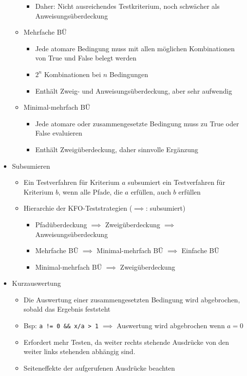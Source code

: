 \documentclass{article}
\begin{document}
\begin{itemize}
\begin{itemize}
\begin{itemize}
      \item Daher: Nicht ausreichendes Testkriterium, noch schwächer als Anweisungsüberdeckung
    \end{itemize}
    \item Mehrfache BÜ
    \begin{itemize}
      \item Jede atomare Bedingung muss mit allen möglichen Kombinationen von True und False belegt werden
      \item $2^n$ Kombinationen bei $n$ Bedingungen
      \item Enthält Zweig- und Anweisungsüberdeckung, aber sehr aufwendig
    \end{itemize}
    \item Minimal-mehrfach BÜ
    \begin{itemize}
      \item Jede atomare oder zusammengesetzte Bedingung muss zu True oder False evaluieren
      \item Enthält Zweigüberdeckung, daher sinnvolle Ergänzung
    \end{itemize}
  \end{itemize}
  \item Subsumieren
  \begin{itemize}
    \item Ein Testverfahren für Kriterium $a$ subsumiert ein Testverfahren für Kriterium $b$, wenn alle Pfade, die $a$ erfüllen, auch $b$ erfüllen
    \item Hierarchie der KFO-Teststrategien ($\implies$: subsumiert)
    \begin{itemize}
      \item Pfadüberdeckung $\implies$ Zweigüberdeckung $\implies$ Anweisungsüberdeckung
      \item Mehrfache BÜ $\implies$ Minimal-mehrfach BÜ $\implies$ Einfache BÜ
      \item Minimal-mehrfach BÜ $\implies$ Zweigüberdeckung
    \end{itemize}
  \end{itemize}
  \item Kurzauswertung
  \begin{itemize}
    \item Die Auswertung einer zusammengesetzten Bedingung wird abgebrochen, sobald das Ergebnis feststeht
    \item Bsp: \texttt{a != 0 \&\& x/a > 1} $\implies$ Auswertung wird abgebrochen wenn $a=0$
    \item Erfordert mehr Testen, da weiter rechts stehende Ausdrücke von den weiter links stehenden abhängig sind.
    \item Seiteneffekte der aufgerufenen Ausdrücke beachten
  \end{itemize}
\end{itemize}
\end{document}
